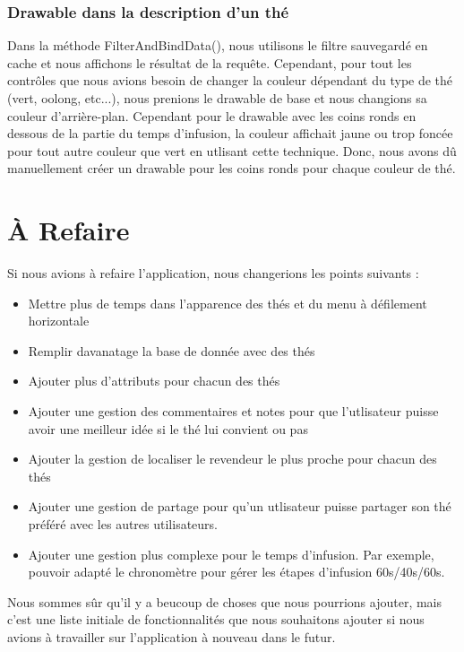 \documentclass[a4paper,12pt]{article}
\begin{document}
\begin{spacing}{1}
	\subsubsection*{Drawable dans la description d'un thé}
	Dans la méthode FilterAndBindData(), nous utilisons le filtre sauvegardé en cache et nous affichons le résultat de la requête. Cependant, pour tout les contrôles que nous avions besoin de changer la couleur dépendant du type de thé (vert, oolong, etc...), nous prenions le drawable de base et nous changions sa couleur d'arrière-plan. Cependant pour le drawable avec les coins ronds en dessous de la partie du temps d'infusion, la couleur affichait jaune ou trop foncée pour tout autre couleur que vert en utlisant cette technique. Donc, nous avons dû manuellement créer un drawable pour les coins ronds pour chaque couleur de thé.
	\section*{À Refaire}
	Si nous avions à refaire l'application, nous changerions les points suivants :
	\begin{itemize}
		\item Mettre plus de temps dans l'apparence des thés et du menu à défilement horizontale
		\item Remplir davanatage la base de donnée avec des thés
		\item Ajouter plus d'attributs pour chacun des thés
		\item Ajouter une gestion des commentaires et notes pour que l'utlisateur puisse avoir une meilleur idée si le thé lui convient ou pas
		\item Ajouter la gestion de localiser le revendeur le plus proche pour chacun des thés
		\item Ajouter une gestion de partage pour qu'un utlisateur puisse partager son thé préféré avec les autres utilisateurs.
		\item Ajouter une gestion plus complexe pour le temps d'infusion. Par exemple, pouvoir adapté le chronomètre pour gérer les étapes d'infusion 60s/40s/60s.
	\end{itemize}
	Nous sommes sûr qu'il y a beucoup de choses que nous pourrions ajouter, mais c'est une liste initiale de fonctionnalités que nous souhaitons ajouter si nous avions à travailler sur l'application à nouveau dans le futur.
	\end{spacing}                                                 
\end{document}
